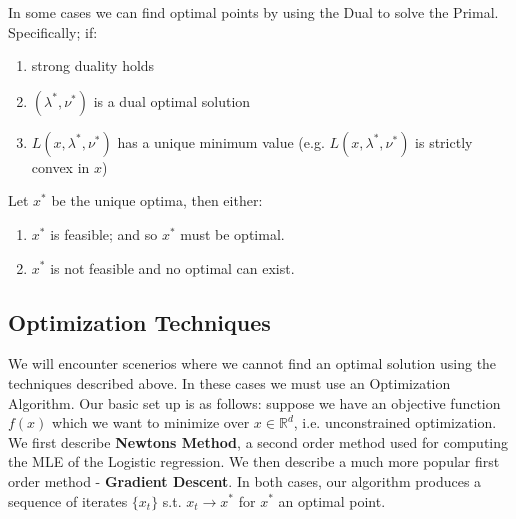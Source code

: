 \documentclass[]{article}
\theoremstyle{mattstyle}
\newtheorem{theorem}{Theorem}[section]
\theoremstyle{definition}
\begin{document}



In some cases we can find optimal points by using the Dual to solve the Primal. Specifically; if:
\begin{enumerate}
	\item strong duality holds
	\item $(\lambda^*, \nu^*)$ is a dual optimal solution
	\item $L(x, \lambda^*, \nu^*)$ has a unique minimum value (e.g. $L(x, \lambda^*, \nu^*)$ is strictly convex in $x$)
\end{enumerate}
Let $x^*$ be the unique optima, then either:
\begin{enumerate}
	\item $x^*$ is feasible; and so $x^*$ must be optimal.
	\item $x^*$ is not feasible and no optimal can exist.
\end{enumerate}

\subsection{Optimization Techniques}

We will encounter scenerios where we cannot find an optimal solution using the techniques described above. In these cases we must use an Optimization Algorithm. Our basic set up is as follows: suppose we have an objective function $f(x)$ which we want to minimize over $x\in\mathbb{R}^d$, i.e. unconstrained optimization. We first describe \textbf{Newtons Method}, a second order method used for computing the MLE of the Logistic regression. We then describe a much more popular first order method - \textbf{Gradient Descent}. In both cases, our algorithm produces a sequence of iterates $\{x_t\}$ s.t. $x_t \rightarrow x^*$ for $x^*$ an optimal point.
\end{document}
